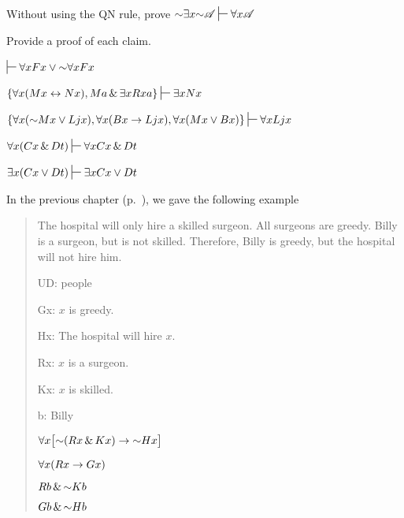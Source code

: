\problempart Without using the QN rule, prove $\enot\exists x\enot\script{A} \sststile{}{} \forall x\script{A}$

\problempart
\label{pr.someQLproofs}
Provide a proof of each claim.
\begin{earg}
\item $\sststile{}{}  \forall x Fx \eor \enot \forall x Fx$
\item $\{\forall x(Mx \eiff Nx), Ma\eand\exists x Rxa\}\sststile{}{}  \exists x Nx$
\item $\{\forall x(\enot Mx \eor Ljx), \forall x(Bx\eif Ljx), \forall x(Mx\eor Bx)\}\sststile{}{}  \forall xLjx$
\item $\forall x(Cx \eand Dt)\sststile{}{}  \forall xCx \eand Dt$
\item $\exists x(Cx \eor Dt)\sststile{}{}  \exists x Cx \eor Dt$
\end{earg}

\problempart

In the previous chapter (p.~\pageref{surgeon2}), we gave the following example

	\begin{quote}
	
	
	The hospital will only hire a skilled surgeon. All surgeons are greedy. Billy is a surgeon, but is not skilled. Therefore, Billy is greedy, but the hospital will not hire him.
	
	\begin{ekey}
	\item[UD:] people
	\item[Gx:] $x$ is greedy.
	\item[Hx:] The hospital will hire $x$.
	\item[Rx:] $x$ is a surgeon.
	\item[Kx:] $x$ is skilled.
	\item[b:] Billy
	\end{ekey}
	
	\begin{earg}
	\label{surgeon2}
	\item[] $\forall x\bigl[\mathord{\sim} (Rx \,\&\, Kx) \rightarrow \mathord{\sim} Hx\bigr]$
	\item[] $\forall x(Rx \rightarrow Gx)$
	\item[] $Rb \,\&\, \mathord{\sim} Kb$
	\item[\therefore] $Gb \,\&\, \mathord{\sim} Hb$
	\end{earg}
	
	\end{quote}

